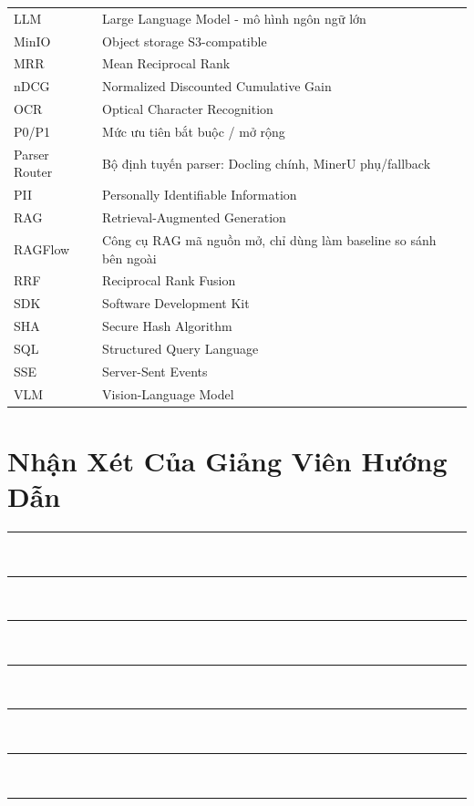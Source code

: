 \documentclass[a4paper,12pt]{extreport}
\begin{document}
\begin{longtable}{p{3.2cm}p{10.2cm}}
LLM & Large Language Model - mô hình ngôn ngữ lớn\\
MinIO & Object storage S3-compatible\\
MRR & Mean Reciprocal Rank\\
nDCG & Normalized Discounted Cumulative Gain\\
OCR & Optical Character Recognition\\
P0/P1 & Mức ưu tiên bắt buộc / mở rộng\\
Parser Router & Bộ định tuyến parser: Docling chính, MinerU phụ/fallback\\
PII & Personally Identifiable Information\\
RAG & Retrieval-Augmented Generation\\
RAGFlow & Công cụ RAG mã nguồn mở, chỉ dùng làm baseline so sánh bên ngoài\\
RRF & Reciprocal Rank Fusion\\
SDK & Software Development Kit\\
SHA & Secure Hash Algorithm\\
SQL & Structured Query Language\\
SSE & Server-Sent Events\\
VLM & Vision-Language Model\\
\bottomrule
\end{longtable}
\clearpage

\chapter*{Nhận Xét Của Giảng Viên Hướng Dẫn}

\vspace{1cm}
\noindent\rule{\textwidth}{0.4pt}\\[1.2cm]
\noindent\rule{\textwidth}{0.4pt}\\[1.2cm]
\noindent\rule{\textwidth}{0.4pt}\\[1.2cm]
\noindent\rule{\textwidth}{0.4pt}\\[1.2cm]
\noindent\rule{\textwidth}{0.4pt}\\[1.2cm]
\noindent\rule{\textwidth}{0.4pt}\\[1.2cm]
\noindent\rule{\textwidth}{0.4pt}
\clearpage

\setcounter{page}{1}
\end{document}
